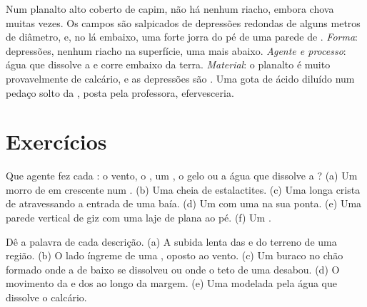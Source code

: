 \begin{example}
Num planalto alto coberto de capim, não há nenhum riacho, embora chova
muitas vezes. Os campos são salpicados de depressões redondas de alguns
metros de diâmetro, e, no  lá embaixo, uma  forte jorra do pé
de uma parede de . \emph{Forma}: depressões, nenhum riacho na
superfície, uma  mais abaixo. \emph{Agente e processo}: água que
dissolve a  e corre embaixo da terra. \emph{Material}: o planalto é
muito provavelmente de calcário, e as depressões são . Uma gota de
ácido diluído num pedaço solto da , posta pela professora,
efervesceria.
\end{example}

\section{Exercícios}

\begin{exercise}[$\star$]\label{exo:g9:landforms:1}
Que agente fez cada : o vento, o , um , o gelo ou a
água que dissolve a ? (a) Um morro de  em crescente num
. (b) Uma  cheia de estalactites. (c) Uma longa crista de
 atravessando a entrada de uma baía. (d) Um  com uma
 na sua ponta. (e) Uma parede vertical de giz com uma laje de 
plana ao pé. (f) Um .
\end{exercise}

\begin{exercise}[$\star$]\label{exo:g9:landforms:2}
Dê a palavra de cada descrição. (a) A subida lenta das  e do
terreno de uma região. (b) O lado íngreme de uma , oposto ao vento.
(c) Um buraco no chão formado onde a  de baixo se dissolveu ou onde
o teto de uma  desabou. (d) O movimento da  e dos  ao
longo da margem. (e) Uma  modelada pela água que dissolve o
calcário.
\end{exercise}

